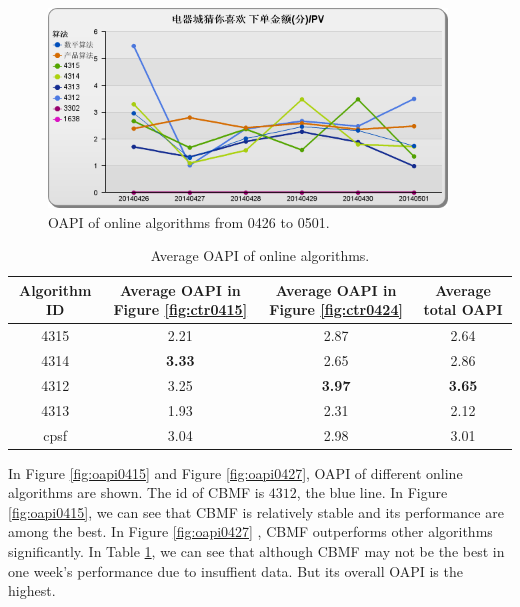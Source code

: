 \begin{figure}
\begin{center}



\includegraphics[width=400px]{fig/yixunexp/cvr0502.png}
\caption{\label{fig:oapi0426} OAPI of online algorithms  from 0426 to 0501.}
\end{center}
\end{figure}

\begin{table}[h]


\begin{center}
\begin{tabular}{| c | c | c | c |}
\hline
Algorithm ID & Average OAPI in Figure \ref{fig:ctr0415} & Average OAPI in Figure \ref{fig:ctr0424} & Average total OAPI \\
\hline
4315 &2.21 & 2.87 & 2.64\\
\hline
4314 &\textbf{3.33} & 2.65& 2.86\\
\hline
4312 &3.25& \textbf{3.97}& \textbf{3.65}\\
\hline
4313 & 1.93 & 2.31& 2.12\\
\hline
cpsf & 3.04& 2.98 & 3.01\\
\hline
\end{tabular}
\caption{\label{tbl:cvravg} Average OAPI of online algorithms.}
\end{center}
\end{table}

In Figure \ref{fig:oapi0415} and Figure \ref{fig:oapi0427}, OAPI of different online algorithms are shown. The id of CBMF is $4312$, the blue line. In Figure \ref{fig:oapi0415}, we can see that CBMF is relatively stable and its performance are among the best. In Figure \ref{fig:oapi0427} , CBMF outperforms other algorithms significantly. In Table \ref{tbl:cvravg}, we can see that although CBMF may not be the best in one week's performance due to insuffient data. But its overall OAPI is the highest.

